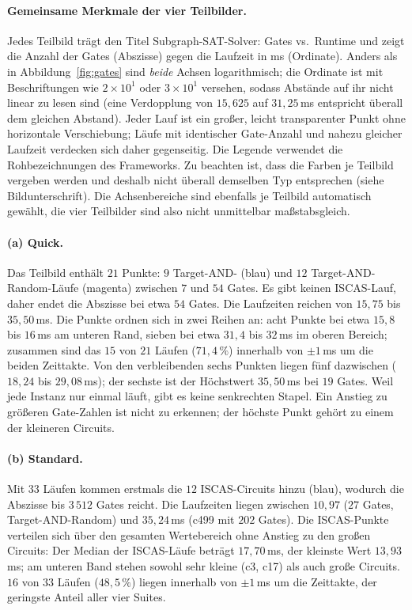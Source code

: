 \documentclass[a4paper,12pt]{article}
\theoremstyle{definition}
\begin{document}
\paragraph{Gemeinsame Merkmale der vier Teilbilder.} Jedes Teilbild trägt den Titel \glqq Subgraph-SAT-Solver: Gates vs.\ Runtime\grqq{} und zeigt die Anzahl der Gates (Abszisse) gegen die Laufzeit in ms (Ordinate). Anders als in Abbildung~\ref{fig:gates} sind \emph{beide} Achsen logarithmisch; die Ordinate ist mit Beschriftungen wie $2 \times 10^{1}$ oder $3 \times 10^{1}$ versehen, sodass Abstände auf ihr nicht linear zu lesen sind (eine Verdopplung von $15{,}625$ auf $31{,}25$\,ms entspricht überall dem gleichen Abstand). Jeder Lauf ist ein großer, leicht transparenter Punkt ohne horizontale Verschiebung; Läufe mit identischer Gate-Anzahl und nahezu gleicher Laufzeit verdecken sich daher gegenseitig. Die Legende verwendet die Rohbezeichnungen des Frameworks. Zu beachten ist, dass die Farben je Teilbild vergeben werden und deshalb nicht überall demselben Typ entsprechen (siehe Bildunterschrift). Die Achsenbereiche sind ebenfalls je Teilbild automatisch gewählt, die vier Teilbilder sind also nicht unmittelbar maßstabsgleich.

\paragraph{(a) Quick.} Das Teilbild enthält $21$ Punkte: $9$ Target-AND- (blau) und $12$ Target-AND-Random-Läufe (magenta) zwischen $7$ und $54$ Gates. Es gibt keinen ISCAS-Lauf, daher endet die Abszisse bei etwa $54$ Gates. Die Laufzeiten reichen von $15{,}75$ bis $35{,}50$\,ms. Die Punkte ordnen sich in zwei Reihen an: acht Punkte bei etwa $15{,}8$ bis $16$\,ms am unteren Rand, sieben bei etwa $31{,}4$ bis $32$\,ms im oberen Bereich; zusammen sind das $15$ von $21$ Läufen ($71{,}4\,\%$) innerhalb von $\pm 1$\,ms um die beiden Zeittakte. Von den verbleibenden sechs Punkten liegen fünf dazwischen ($18{,}24$ bis $29{,}08$\,ms); der sechste ist der Höchstwert $35{,}50$\,ms bei $19$ Gates. Weil jede Instanz nur einmal läuft, gibt es keine senkrechten Stapel. Ein Anstieg zu größeren Gate-Zahlen ist nicht zu erkennen; der höchste Punkt gehört zu einem der kleineren Circuits.

\paragraph{(b) Standard.} Mit $33$ Läufen kommen erstmals die $12$ ISCAS-Circuits hinzu (blau), wodurch die Abszisse bis $3\,512$ Gates reicht. Die Laufzeiten liegen zwischen $10{,}97$ ($27$ Gates, Target-AND-Random) und $35{,}24$\,ms (c499 mit $202$ Gates). Die ISCAS-Punkte verteilen sich über den gesamten Wertebereich ohne Anstieg zu den großen Circuits: Der Median der ISCAS-Läufe beträgt $17{,}70$\,ms, der kleinste Wert $13{,}93$\,ms; am unteren Band stehen sowohl sehr kleine (c3, c17) als auch große Circuits. $16$ von $33$ Läufen ($48{,}5\,\%$) liegen innerhalb von $\pm 1$\,ms um die Zeittakte, der geringste Anteil aller vier Suites.
\end{document}
